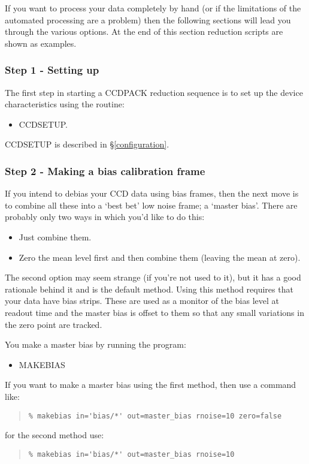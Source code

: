 \documentclass[twoside,11pt]{article}
\newcommand{\hyperref}[4]{#2\ref{#4}#3}
\newcommand{\htmlref}[2]{#1}
\newcommand{\xlabel}[1]{}
\renewcommand{\_}{\texttt{\symbol{95}}}
\newenvironment{myquote}{\begin{quote}\begin{small}}{\end{small}\end{quote}}
\newcommand{\routine}[1]{{\sc #1}}
\newcommand{\xroutine}[1]{\htmlref{{\sc #1}}{#1}}
\begin{document}
If you want to process your data completely by hand (or if the
limitations of the automated processing are a problem) then the
following sections will lead you through the various options. At the
end of this section reduction scripts are shown as examples.

\subsubsection{Step 1 - Setting up}
The first step in starting a CCDPACK reduction sequence is to set up
the device characteristics using the routine:
\begin{itemize}
\item \xroutine{CCDSETUP}.
\end{itemize}
\routine{CCDSETUP} is described \hyperref{elsewhere}{in \S}{}{configuration}.

\subsubsection{Step 2 - Making a bias calibration frame \xlabel{masterbias}
               \label{masterbias}}
If you intend to debias your CCD data using bias frames, then the next
move is to combine all these into a `best bet' low noise frame; a
`master bias'. There are probably only two ways in which you'd like to
do this:
\begin{itemize}
\item Just combine them.
\item Zero the mean level first and then combine them (leaving the
mean at zero).
\end{itemize}

The second option may seem strange (if you're not used to it), but it
has a good rationale behind it and is the default method. Using this
method requires that your data have bias strips.
These are used as a monitor of the bias level at readout time and the
master bias is offset to them so that any small variations in the zero
point are tracked.

You make a master bias by running the program:
\begin{itemize}
\item \xroutine{MAKEBIAS}
\end{itemize}
If you want to make a master bias using the first method, then use a
command like:
\begin{myquote}
\begin{verbatim}
% makebias in='bias/*' out=master_bias rnoise=10 zero=false
\end{verbatim}
\end{myquote}
for the second method use:
\begin{myquote}
\begin{verbatim}
% makebias in='bias/*' out=master_bias rnoise=10
\end{verbatim}
\end{myquote}
\end{document}

